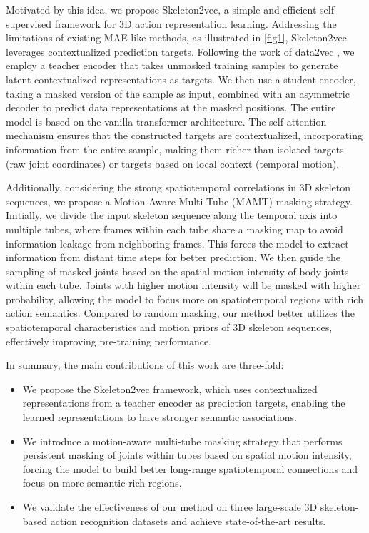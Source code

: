 Motivated by this idea, we propose Skeleton2vec, a simple and efficient self-supervised
framework for 3D action representation learning. Addressing the limitations of existing
MAE-like methods, as illustrated in \cref{fig1}, Skeleton2vec leverages contextualized
prediction targets. Following the work of data2vec \cite{baevski2022data2vec, baevski2023efficient},
we employ a teacher encoder that takes unmasked training samples to generate latent
contextualized representations as targets. We then use a student encoder, taking a
masked version of the sample as input, combined with an asymmetric decoder to
predict data representations at the masked positions. The entire model is based on the
vanilla transformer architecture. The self-attention mechanism ensures that the
constructed targets are contextualized, incorporating information from the entire
sample, making them richer than isolated targets (\eg raw joint coordinates)
or targets based on local context (\eg temporal motion).

Additionally, considering the strong spatiotemporal correlations in 3D skeleton sequences,
we propose a Motion-Aware Multi-Tube (MAMT) masking strategy. Initially, we divide the input skeleton
sequence along the temporal axis into multiple tubes, where frames within each tube share
a masking map to avoid information leakage from neighboring frames. This forces the model to
extract information from distant time steps for better prediction. We then guide the sampling
of masked joints based on the spatial motion intensity of body joints within each tube.
Joints with higher motion intensity will be masked with higher probability, allowing
the model to focus more on spatiotemporal regions with rich action semantics. Compared
to random masking, our method better utilizes the spatiotemporal characteristics and
motion priors of 3D skeleton sequences, effectively improving pre-training performance.

In summary, the main contributions of this work are three-fold:
\begin{itemize}
    \item{
        We propose the Skeleton2vec framework, which uses contextualized representations
        from a teacher encoder as prediction targets, enabling the learned representations
        to have stronger semantic associations.
    }
    \item{
        We introduce a motion-aware multi-tube masking strategy that performs persistent masking
        of joints within tubes based on spatial motion intensity, forcing the model to
        build better long-range spatiotemporal connections and focus on more semantic-rich regions.
    }
    \item{
        We validate the effectiveness of our method on three large-scale 3D skeleton-based
        action recognition datasets and achieve state-of-the-art results.
    }
\end{itemize}